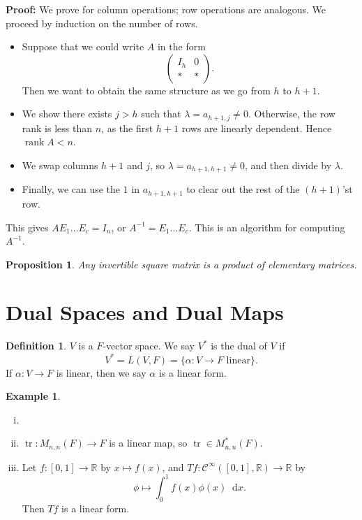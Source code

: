 \documentclass[12pt]{article}
\DeclareMathOperator{\rank}{rank}
\DeclareMathOperator{\tr}{tr}
\newcommand{\diff}{\mathop{}\!\mathrm{d}}
\newtheorem{proposition}{Proposition}[section]
\theoremstyle{definition}
\newtheorem{definition}{Definition}[section]
\newtheorem{example}{Example}[section]
\theoremstyle{remark}
\begin{document}
\begin{adjustbox}{minipage = \columnwidth - 25.5pt, margin=1em, frame=1pt, margin=0em}
\textbf{Proof:} We prove for column operations; row operations are analogous. We proceed by induction on the number of rows.
\begin{itemize}
	\item Suppose that we could write $A$ in the form
		\[
		\begin{pmatrix}
			I_h & 0 \\
			\ast & \ast
		\end{pmatrix}
		.\]
		Then we want to obtain the same structure as we go from $h$ to $h + 1$.
	\item We show there exists $j > h$ such that $\lambda = a_{h+1, j} \neq 0$. Otherwise, the row rank is less than $n$, as the first $h+1$ rows are linearly dependent. Hence $\rank A < n$.
	\item We swap columns $h + 1$ and $j$, so $\lambda = a_{h+1,h+1} \neq 0$, and then divide by $\lambda$.
	\item Finally, we can use the $1$ in $a_{h+1, h+1}$ to clear out the rest of the $(h+1)$'st row.
\end{itemize}

\end{adjustbox}

This gives $A E_1 \ldots E_c = I_n$, or $A^{-1} = E_1 \ldots E_c$. This is an algorithm for computing $A^{-1}$.

\begin{proposition}
	Any invertible square matrix is a product of elementary matrices.
\end{proposition}

\newpage

\section{Dual Spaces and Dual Maps}%
\label{sec:dual_spaces_and_dual_maps}

\begin{definition}
	$V$ is a $F$-vector space. We say $V^{\ast}$ is the dual of $V$ if
	\[
		V^{\ast} = L(V, F) = \{ \alpha : V \to F \text{ linear}\}
	.\]
	If $\alpha : V \to F$ is linear, then we say $\alpha$ is a linear form.
\end{definition}

\begin{adjustbox}{minipage = \columnwidth - 25.5pt, margin=1em, frame=1pt, margin=0em}
\begin{example}
	\begin{enumerate}[(i)]
		\item[]
		\item $\tr : M_{n, n}(F) \to F$ is a linear map, so $\tr \in M_{n,n}^{\ast}(F)$.
		\item Let $f : [0, 1] \to \mathbb{R}$ by $x \mapsto f(x)$, and $Tf : \mathcal{C}^{\infty}([0,1], \mathbb{R}) \to \mathbb{R}$ by
			\[
				\phi \mapsto \int_{0}^{1} f(x)\phi(x)\diff x
			.\]
			Then $Tf$ is a linear form.
	\end{enumerate}
\end{example}
\end{adjustbox}
\end{document}
